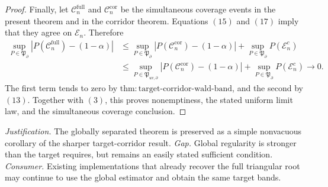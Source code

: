 \documentclass{article}
\begin{document}
\begin{proof}
Finally, let \(\mathcal C_n^{\mathrm{full}}\) and
\(\mathcal C_n^{\mathrm{cor}}\) be the simultaneous coverage events in the
present theorem and in the corridor theorem.  Equations \((15)\) and
\((17)\) imply that they agree on \(\mathcal E_n\).  Therefore
\[
\begin{split}
 \sup_{P\in\mathfrak P_{\partial}}
 \left|P(\mathcal C_n^{\mathrm{full}})-(1-\alpha)\right|
 &\leq
 \sup_{P\in\mathfrak P_{\partial}}
 \left|P(\mathcal C_n^{\mathrm{cor}})-(1-\alpha)\right|
 +\sup_{P\in\mathfrak P_{\partial}}P(\mathcal E_n^c)\\
 &\leq
 \sup_{P\in\mathfrak P_{uv,\partial}}
 \left|P(\mathcal C_n^{\mathrm{cor}})-(1-\alpha)\right|
 +\sup_{P\in\mathfrak P_{\partial}}P(\mathcal E_n^c)
 \longrightarrow0.
\end{split}
 \tag{18}
\]
The first term tends to zero by
\(\mathrm{thm{:}target\mbox{-}corridor\mbox{-}wald\mbox{-}band}\), and
the second by \((13)\).  Together with \((3)\), this proves nonemptiness,
the stated uniform limit law, and the simultaneous coverage conclusion.
\end{proof}
\par\smallskip\noindent \textit{Justification.} The globally separated theorem is preserved as a simple nonvacuous corollary of the sharper target-corridor result. \textit{Gap.} Global regularity is stronger than the target requires, but remains an easily stated sufficient condition. \textit{Consumer.} Existing implementations that already recover the full triangular root may continue to use the global estimator and obtain the same target bands.
\end{document}

